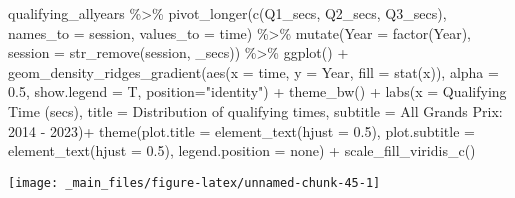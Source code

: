 \documentclass[
]{book}
\newenvironment{Shaded}{\begin{snugshade}}{\end{snugshade}}
\newcommand{\AttributeTok}[1]{\textcolor[rgb]{0.77,0.63,0.00}{#1}}
\newcommand{\FloatTok}[1]{\textcolor[rgb]{0.00,0.00,0.81}{#1}}
\newcommand{\FunctionTok}[1]{\textcolor[rgb]{0.00,0.00,0.00}{#1}}
\newcommand{\NormalTok}[1]{#1}
\newcommand{\SpecialCharTok}[1]{\textcolor[rgb]{0.00,0.00,0.00}{#1}}
\newcommand{\StringTok}[1]{\textcolor[rgb]{0.31,0.60,0.02}{#1}}
\begin{document}
\begin{Shaded}
\begin{Highlighting}[]
\NormalTok{qualifying\_allyears }\SpecialCharTok{\%\textgreater{}\%}
  \FunctionTok{pivot\_longer}\NormalTok{(}\FunctionTok{c}\NormalTok{(}\StringTok{\textquotesingle{}Q1\_secs\textquotesingle{}}\NormalTok{, }\StringTok{\textquotesingle{}Q2\_secs\textquotesingle{}}\NormalTok{, }\StringTok{\textquotesingle{}Q3\_secs\textquotesingle{}}\NormalTok{),}
               \AttributeTok{names\_to =} \StringTok{\textquotesingle{}session\textquotesingle{}}\NormalTok{,}
               \AttributeTok{values\_to =} \StringTok{\textquotesingle{}time\textquotesingle{}}\NormalTok{) }\SpecialCharTok{\%\textgreater{}\%}
  \FunctionTok{mutate}\NormalTok{(}\AttributeTok{Year =} \FunctionTok{factor}\NormalTok{(Year),}
         \AttributeTok{session =} \FunctionTok{str\_remove}\NormalTok{(session, }\StringTok{\textquotesingle{}\_secs\textquotesingle{}}\NormalTok{)) }\SpecialCharTok{\%\textgreater{}\%}
  \FunctionTok{ggplot}\NormalTok{() }\SpecialCharTok{+}
  \FunctionTok{geom\_density\_ridges\_gradient}\NormalTok{(}\FunctionTok{aes}\NormalTok{(}\AttributeTok{x =}\NormalTok{ time, }\AttributeTok{y =}\NormalTok{ Year, }\AttributeTok{fill =} \FunctionTok{stat}\NormalTok{(x)),}
                 \AttributeTok{alpha =} \FloatTok{0.5}\NormalTok{, }\AttributeTok{show.legend =}\NormalTok{ T,}
                 \AttributeTok{position=}\StringTok{"identity"}\NormalTok{) }\SpecialCharTok{+}
  \FunctionTok{theme\_bw}\NormalTok{() }\SpecialCharTok{+}
  \FunctionTok{labs}\NormalTok{(}\AttributeTok{x =} \StringTok{\textquotesingle{}Qualifying Time (secs)\textquotesingle{}}\NormalTok{,}
       \AttributeTok{title =} \StringTok{\textquotesingle{}Distribution of qualifying times\textquotesingle{}}\NormalTok{,}
       \AttributeTok{subtitle =} \StringTok{\textquotesingle{}All Grands Prix: 2014 {-} 2023\textquotesingle{}}\NormalTok{)}\SpecialCharTok{+}
  \FunctionTok{theme}\NormalTok{(}\AttributeTok{plot.title =} \FunctionTok{element\_text}\NormalTok{(}\AttributeTok{hjust =} \FloatTok{0.5}\NormalTok{),}
        \AttributeTok{plot.subtitle =} \FunctionTok{element\_text}\NormalTok{(}\AttributeTok{hjust =} \FloatTok{0.5}\NormalTok{),}
        \AttributeTok{legend.position =} \StringTok{\textquotesingle{}none\textquotesingle{}}\NormalTok{) }\SpecialCharTok{+}
  \FunctionTok{scale\_fill\_viridis\_c}\NormalTok{()}
\end{Highlighting}
\end{Shaded}

\begin{center}\texttt{[image: \_main\_files/figure-latex/unnamed-chunk-45-1]} \end{center}
\end{document}

